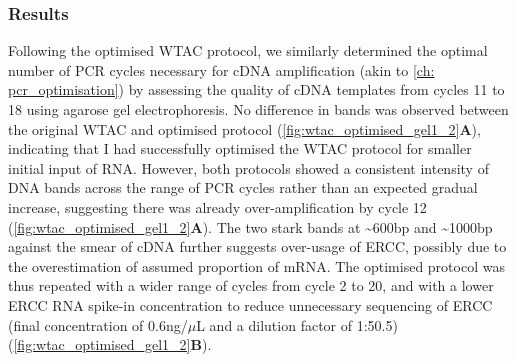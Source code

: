 \subsubsection{Results}
Following the optimised WTAC protocol, we similarly determined the optimal number of PCR cycles necessary for cDNA amplification (akin to \cref{ch: pcr_optimisation}) by assessing the quality of cDNA templates from cycles 11 to 18 using agarose gel electrophoresis. No difference in bands was observed between the original WTAC and optimised protocol (\cref{fig:wtac_optimised_gel1_2}\textbf{A}), indicating that I had successfully optimised the WTAC protocol for smaller initial input of RNA. However, both protocols showed a consistent intensity of DNA bands across the range of PCR cycles rather than an expected gradual increase, suggesting there was already over-amplification by cycle 12 (\cref{fig:wtac_optimised_gel1_2}\textbf{A}). The two stark bands at \textasciitilde600bp and \textasciitilde1000bp against the smear of cDNA further suggests over-usage of ERCC, possibly due to the overestimation of assumed proportion of mRNA. The optimised protocol was thus repeated with a wider range of cycles from cycle 2 to 20, and with a lower ERCC RNA spike-in concentration to reduce unnecessary sequencing of ERCC (final concentration of 0.6ng/$\mu$L and a dilution factor of 1:50.5) (\cref{fig:wtac_optimised_gel1_2}\textbf{B}). 
    
